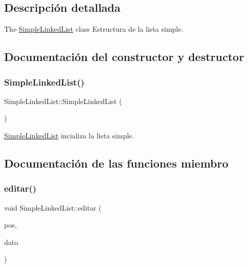 \subsection{Descripción detallada}
The \mbox{\hyperlink{class_simple_linked_list}{Simple\+Linked\+List}} class Estructura de la lista simple. 

\subsection{Documentación del constructor y destructor}
\mbox{\label{class_simple_linked_list_a508909ddc17e7be9e6c37554cac42bf7}} 
\subsubsection{\texorpdfstring{Simple\+Linked\+List()}{SimpleLinkedList()}}
{\footnotesize\ttfamily Simple\+Linked\+List\+::\+Simple\+Linked\+List (\begin{DoxyParamCaption}{ }\end{DoxyParamCaption})\hspace{0.3cm}{\ttfamily [inline]}}



\mbox{\hyperlink{class_simple_linked_list}{Simple\+Linked\+List}} incializa la lista simple. 



\subsection{Documentación de las funciones miembro}
\mbox{\label{class_simple_linked_list_ac2d7b784c2c5b20824a4ab54ce20eaa7}} 
\subsubsection{\texorpdfstring{editar()}{editar()}}
{\footnotesize\ttfamily void Simple\+Linked\+List\+::editar (\begin{DoxyParamCaption}\item[{int}]{pos,  }\item[{Q\+String}]{dato }\end{DoxyParamCaption})\hspace{0.3cm}{\ttfamily [inline]}}



